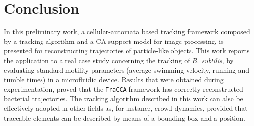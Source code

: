 \section{Conclusion}\label{conclusions}
In this preliminary work, a cellular-automata based tracking framework composed by a tracking algorithm and a CA support model for image processing, is presented for reconstructing trajectories of particle-like objects. This work reports the application to a real case study concerning the tracking of \textit{B. subtilis}, by evaluating  standard motility parameters (average swimming velocity, running and tumble times) in a microfluidic device. Results that were obtained during experimentation, proved that the \texttt{TraCCA} framework has correctly reconstructed bacterial trajectories. The tracking algorithm described in this work can also be effectively adopted in other fields as, for instance, crowd dynamics, provided that traceable elements can be described by means of a bounding box and a position.

